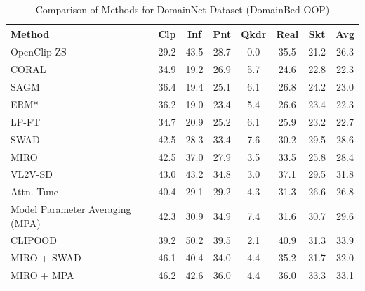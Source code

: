 \documentclass{article} %
\begin{document}
\begin{table}[t]
\small
\centering
\caption{Comparison of Methods for DomainNet Dataset (DomainBed-OOP)}
\begin{tabular}{lccccccc}
\toprule
\textbf{Method} & Clp & Inf & Pnt & Qkdr & Real & Skt & Avg \\ \midrule
OpenClip ZS & 29.2 & 43.5 & 28.7 & 0.0 & 35.5 & 21.2 & 26.3\\
\midrule
CORAL & 34.9 & 19.2 & 26.9 & 5.7 & 24.6 & 22.8 & 22.3 \\ 
SAGM & 36.4 & 19.4 & 25.1 & 6.1 & 26.8 & 24.2 & 23.0 \\ 
ERM* & 36.2 & 19.0 & 23.4 & 5.4 & 26.6 & 23.4 & 22.3 \\ 
LP-FT & 34.7 & 20.9 & 25.2 & 6.1 & 25.9 & 23.2 & 22.7 \\ 
SWAD & 42.5 & 28.3 & 33.4 & 7.6 & 30.2 & 29.5 & 28.6 \\ 
MIRO & 42.5 & 37.0 & 27.9 & 3.5 & 33.5 & 25.8 & 28.4 \\ 
VL2V-SD & 43.0 & 43.2 & 34.8 & 3.0 & 37.1 & 29.5 & 31.8 \\ 
Attn. Tune & 40.4 & 29.1 & 29.2 & 4.3 & 31.3 & 26.6 & 26.8 \\ 
Model Parameter Averaging (MPA) & 42.3 & 30.9 & 34.9 & 7.4 & 31.6 & 30.7 & 29.6 \\ 
CLIPOOD & 39.2  & 50.2  &  39.5  & 2.1  & 40.9 & 31.3 & 33.9\\\hline
MIRO + SWAD & 46.1 & 40.4 & 34.0 & 4.4 & 35.2 & 31.7 & 32.0 \\ 
MIRO + MPA & 46.2 & 42.6 & 36.0 & 4.4 & 36.0 & 33.3 & 33.1 \\ 
\bottomrule
\end{tabular}
\label{table:DomainNet OOP}
\end{table}
\end{document}
